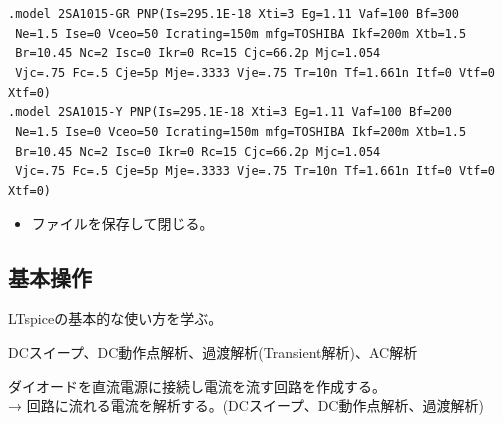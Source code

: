 \begin{enumerate}
\verb|.model 2SA1015-GR PNP(Is=295.1E-18 Xti=3 Eg=1.11 Vaf=100 Bf=300|\\
\verb| Ne=1.5 Ise=0 Vceo=50 Icrating=150m mfg=TOSHIBA Ikf=200m Xtb=1.5|\\
\verb| Br=10.45 Nc=2 Isc=0 Ikr=0 Rc=15 Cjc=66.2p Mjc=1.054|\\
\verb| Vjc=.75 Fc=.5 Cje=5p Mje=.3333 Vje=.75 Tr=10n Tf=1.661n Itf=0 Vtf=0 Xtf=0)|\\
\verb|.model 2SA1015-Y PNP(Is=295.1E-18 Xti=3 Eg=1.11 Vaf=100 Bf=200|\\
\verb| Ne=1.5 Ise=0 Vceo=50 Icrating=150m mfg=TOSHIBA Ikf=200m Xtb=1.5|\\
\verb| Br=10.45 Nc=2 Isc=0 Ikr=0 Rc=15 Cjc=66.2p Mjc=1.054|\\
\verb| Vjc=.75 Fc=.5 Cje=5p Mje=.3333 Vje=.75 Tr=10n Tf=1.661n Itf=0 Vtf=0 Xtf=0)|
    \begin{itemize}
      \item ファイルを保存して閉じる。
    \end{itemize}
\end{enumerate}

\subsection{基本操作}
\begin{description}
  \setlength{\parskip}{0cm} %
  \setlength{\itemsep}{0cm} %
  \item[ゴール] LTspiceの基本的な使い方を学ぶ。
  \item[キーワード] DCスイープ、DC動作点解析、過渡解析(Transient解析)、AC解析
  \item[ストーリー] ダイオードを直流電源に接続し電流を流す回路を作成する。\\ → 回路に流れる電流を解析する。(DCスイープ、DC動作点解析、過渡解析)
\end{description}

